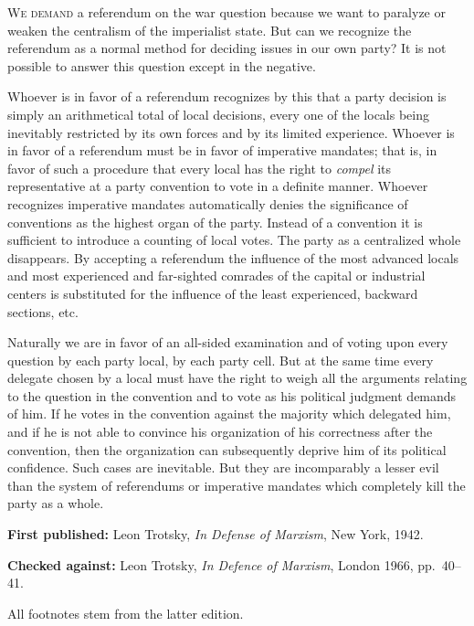
\noindent
\textsc{We demand} a referendum on the war question because we want to paralyze or weaken the centralism of the imperialist state. But can we recognize the referendum as a normal method for deciding issues in our own party? It is not possible to answer this question except in the negative.

Whoever is in favor of a referendum recognizes by this that a party decision is simply an arithmetical total of local decisions, every one of the locals being inevitably restricted by its own forces and by its limited experience. Whoever is in favor of a referendum must be in favor of imperative mandates; that is, in favor of such a procedure that every local has the right to \emph{compel} its representative at a party convention to vote in a definite manner. Whoever recognizes imperative mandates automatically denies the significance of conventions as the highest organ of the party. Instead of a convention it is sufficient to introduce a counting of local votes. The party as a centralized whole disappears. By accepting a referendum the influence of the most advanced locals and most experienced and far-sighted comrades of the capital or industrial centers is substituted for the influence of the least experienced, backward sections, etc.

Naturally we are in favor of an all-sided examination and of voting upon every question by each party local, by each party cell. But at the same time every delegate chosen by a local must have the right to weigh all the arguments relating to the question in the convention and to vote as his political judgment demands of him. If he votes in the convention against the majority which delegated him, and if he is not able to convince his organization of his correctness after the convention, then the organization can subsequently deprive him of its political confidence. Such cases are inevitable. But they are incomparably a lesser evil than the system of referendums or imperative mandates which completely kill the party as a whole.


\begin{letterinfo}
	\textbf{First published:} Leon Trotsky, \emph{In Defense of Marxism}, New York, 1942.
	
	\textbf{Checked against:} Leon Trotsky, \emph{In Defence of Marxism}, London 1966, pp.~40--41.
	
	All footnotes stem from the latter edition.
\end{letterinfo}
